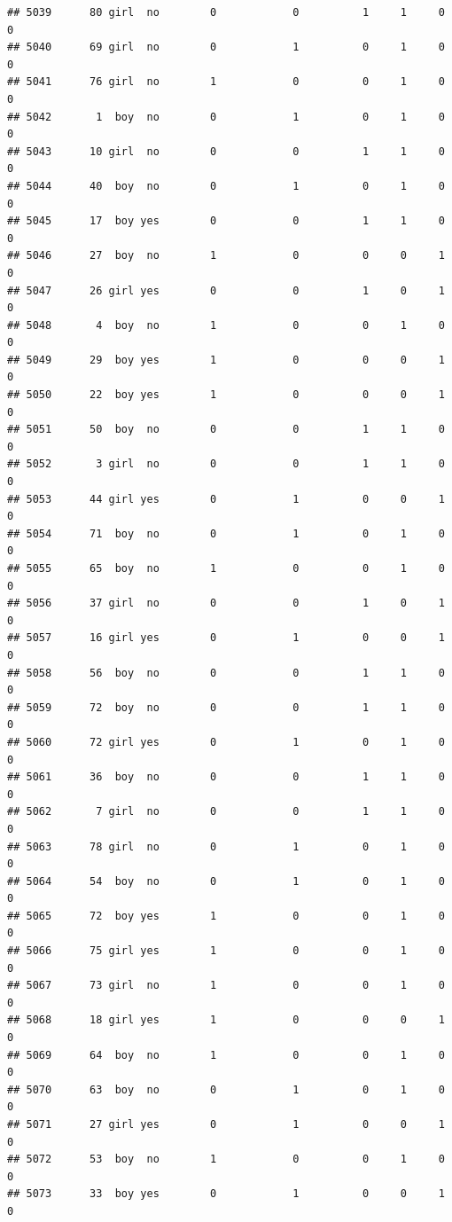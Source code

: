 \documentclass[man]{apa6}
\begin{document}
\begin{verbatim}
## 5039      80 girl  no        0            0          1     1     0     0
## 5040      69 girl  no        0            1          0     1     0     0
## 5041      76 girl  no        1            0          0     1     0     0
## 5042       1  boy  no        0            1          0     1     0     0
## 5043      10 girl  no        0            0          1     1     0     0
## 5044      40  boy  no        0            1          0     1     0     0
## 5045      17  boy yes        0            0          1     1     0     0
## 5046      27  boy  no        1            0          0     0     1     0
## 5047      26 girl yes        0            0          1     0     1     0
## 5048       4  boy  no        1            0          0     1     0     0
## 5049      29  boy yes        1            0          0     0     1     0
## 5050      22  boy yes        1            0          0     0     1     0
## 5051      50  boy  no        0            0          1     1     0     0
## 5052       3 girl  no        0            0          1     1     0     0
## 5053      44 girl yes        0            1          0     0     1     0
## 5054      71  boy  no        0            1          0     1     0     0
## 5055      65  boy  no        1            0          0     1     0     0
## 5056      37 girl  no        0            0          1     0     1     0
## 5057      16 girl yes        0            1          0     0     1     0
## 5058      56  boy  no        0            0          1     1     0     0
## 5059      72  boy  no        0            0          1     1     0     0
## 5060      72 girl yes        0            1          0     1     0     0
## 5061      36  boy  no        0            0          1     1     0     0
## 5062       7 girl  no        0            0          1     1     0     0
## 5063      78 girl  no        0            1          0     1     0     0
## 5064      54  boy  no        0            1          0     1     0     0
## 5065      72  boy yes        1            0          0     1     0     0
## 5066      75 girl yes        1            0          0     1     0     0
## 5067      73 girl  no        1            0          0     1     0     0
## 5068      18 girl yes        1            0          0     0     1     0
## 5069      64  boy  no        1            0          0     1     0     0
## 5070      63  boy  no        0            1          0     1     0     0
## 5071      27 girl yes        0            1          0     0     1     0
## 5072      53  boy  no        1            0          0     1     0     0
## 5073      33  boy yes        0            1          0     0     1     0

\end{verbatim}
\end{document}
